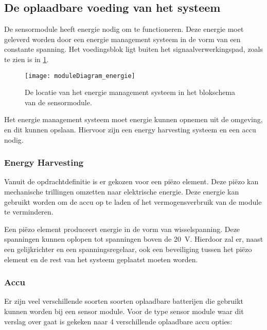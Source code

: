 

\subsection{De oplaadbare voeding van het systeem} \label{sec:energy}

De sensormodule heeft energie nodig om te functioneren. Deze energie moet geleverd worden door een energie management systeem in de vorm van een constante spanning. Het voedingsblok ligt buiten het signaalverwerkingspad, zoals te zien is in \cref{fig:moduleDiagram_energie}.

\begin{figure}[!htbp]
    \centering
    \texttt{[image: moduleDiagram\_energie]}
    \caption{De locatie van het energie management systeem in het blokschema van de sensormodule.}
    \label{fig:moduleDiagram_energie}
\end{figure}

Het energie management systeem moet energie kunnen opnemen uit de omgeving, en dit kunnen opslaan. Hiervoor zijn een energy harvesting systeem en een accu nodig.

\subsubsection{Energy Harvesting} \label{sec:harvesting}

Vanuit de opdrachtdefinitie is er gekozen voor een piëzo element. Deze piëzo kan mechanische trillingen omzetten naar elektrische energie. Deze energie kan gebruikt worden om de accu op te laden of het vermogensverbruik van de module te verminderen.

Een piëzo element produceert energie in de vorm van wisselspanning. Deze spanningen kunnen oplopen tot spanningen boven de \qty{20}{\volt}.%
Hierdoor zal er, naast een gelijkrichter en een spanningsregelaar, ook een beveiliging tussen het piëzo element en de rest van het systeem geplaatst moeten worden.


\subsubsection{Accu} \label{sec:batterijOntwerp}
Er zijn veel verschillende soorten soorten oplaadbare batterijen die gebruikt kunnen worden bij een sensor module. 
Voor de type sensor module waar dit verslag over gaat is gekeken naar 4 verschillende oplaadbare accu opties\cite{battery_comparison}:

